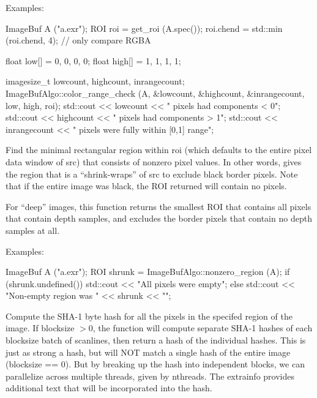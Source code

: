 \smallskip
\noindent Examples:
\begin{code}
    ImageBuf A ("a.exr");
    ROI roi = get_roi (A.spec());
    roi.chend = std::min (roi.chend, 4);  // only compare RGBA

    float low[] = {0, 0, 0, 0};
    float high[] = {1, 1, 1, 1};

    imagesize_t lowcount, highcount, inrangecount;
    ImageBufAlgo::color_range_check (A, &lowcount, &highcount, &inrangecount,
                                     low, high, roi);
    std::cout << lowcount << " pixels had components < 0\n";
    std::cout << highcount << " pixels had components > 1\n";
    std::cout << inrangecount << " pixels were fully within [0,1] range\n";
\end{code}
\apiend


 

Find the minimal rectangular region within {\cf roi} (which defaults to
the entire pixel data window of {\cf src}) that consists of nonzero pixel
values.  In other words, gives the region that is a ``shrink-wraps''
of {\cf src} to exclude black border pixels.  Note that if the entire
image was black, the ROI returned will contain no pixels.

For ``deep'' images, this function returns the smallest ROI that contains
all pixels that contain depth samples, and excludes the border pixels
that contain no depth samples at all.

\smallskip
\noindent Examples:
\begin{code}
    ImageBuf A ("a.exr");
    ROI shrunk = ImageBufAlgo::nonzero_region (A);
    if (shrunk.undefined())
        std::cout << "All pixels were empty\n";
    else
        std::cout << "Non-empty region was " << shrunk << "\n";
\end{code}
\apiend


 

Compute the SHA-1 byte hash for all the pixels in the specifed region of
the image.  If {\cf blocksize} $> 0$, the function will compute separate
SHA-1 hashes of each {\cf blocksize} batch of scanlines, then return a
hash of the individual hashes.  This is just as strong a hash, but will
NOT match a single hash of the entire image ({\cf blocksize == 0}).  But
by breaking up the hash into independent blocks, we can parallelize
across multiple threads, given by {\cf nthreads}.
The {\cf extrainfo} provides additional text that will be
incorporated into the hash.

